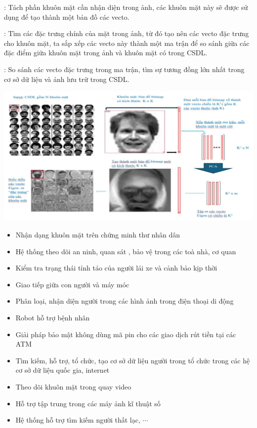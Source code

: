 \documentclass[12pt,a4paper]{article}
\begin{document}
: Tách phần khuôn mặt cần nhận diện trong ảnh, các khuôn mặt này sẽ được sử dụng để tạo thành một bản đồ các vecto.

: Tìm các đặc trưng chính của mặt trong ảnh, từ đó tạo nên các vecto đặc trưng cho khuôn mặt, ta sắp xếp các vecto này thành một ma trận để so sánh giữa các đặc điểm giữa khuôn mặt trong ảnh và khuôn mặt có trong CSDL.

: So sánh các vecto đặc trưng trong ma trận, tìm sự tương đồng lớn nhất trong cơ sở dữ liệu và ảnh lưu trữ trong CSDL.
\begin{center}
    \includegraphics[width = 1\textwidth]{7.png}
\end{center}
\begin{itemize}
    \item Nhận dạng khuôn mặt trên chứng minh thư nhân dân
    \item Hệ thống theo dõi an ninh, quan sát , bảo vệ trong các toà nhà, cơ quan
    \item Kiểm tra trạng thái tỉnh táo của người lái xe và cảnh bảo kịp thời
    \item Giao tiếp giữa con người và máy móc
    \item Phân loại, nhận diện người trong các hình ảnh trong điện thoại di động
    \item Robot hỗ trợ bệnh nhân
    \item Giải pháp bảo mật không dùng mã pin cho các giao dịch rút tiền tại các ATM
    \item Tìm kiếm, hỗ trợ, tổ chức, tạo cơ sở dữ liệu người trong tổ chức trong các hệ cơ sở dữ liệu quốc gia, internet
    \item Theo dõi khuôn mặt trong quay video
    \item Hỗ trợ tập trung trong các máy ảnh kĩ thuật số
    \item Hệ thống hỗ trợ tìm kiếm người thất lạc, $\cdots$

\end{itemize}
\end{document}
